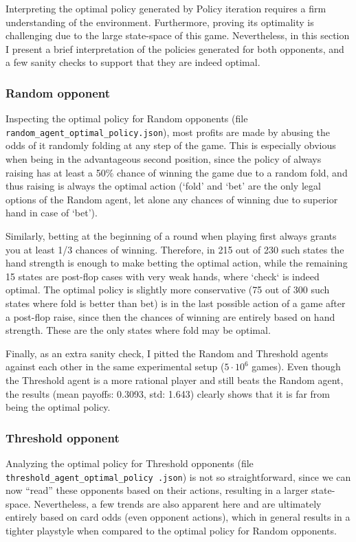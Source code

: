 Interpreting the optimal policy generated by Policy iteration requires a firm understanding of the environment. Furthermore, proving its optimality is challenging due to the large state-space of this game. Nevertheless, in this section I present a brief interpretation of the policies generated for both opponents, and a few sanity checks to support that they are indeed optimal.

\subsubsection{Random opponent}

Inspecting the optimal policy for Random opponents (file \Verb|random_agent_optimal_policy.json|), most profits are made by abusing the odds of it randomly folding at any step of the game. This is especially obvious when being in the advantageous second position, since the policy of always raising has at least a 50\% chance of winning the game due to a random fold, and thus raising is always the optimal action (`fold' and `bet' are the only legal options of the Random agent, let alone any chances of winning due to superior hand in case of `bet').

Similarly, betting at the beginning of a round when playing first always grants you at least 1/3 chances of winning. Therefore, in 215 out of 230 such states the hand strength is enough to make betting the optimal action, while the remaining 15 states are post-flop cases with very weak hands, where `check` is indeed optimal. The optimal policy is slightly more conservative (75 out of 300 such states where fold is better than bet) is in the last possible action of a game after a post-flop raise, since then the chances of winning are entirely based on hand strength. These are the only states where fold may be optimal.

Finally, as an extra sanity check, I pitted the Random and Threshold agents against each other in the same experimental setup ($5\cdot10^6$ games). Even though the Threshold agent is a more rational player and still beats the Random agent, the results (mean payoffs: 0.3093, std: 1.643) clearly shows that it is far from being the optimal policy.

\subsubsection{Threshold opponent}

Analyzing the optimal policy for Threshold opponents (file \texttt{threshold\_agent\_optimal\_policy .json}) is not so straightforward, since we can now ``read'' these opponents based on their actions, resulting in a larger state-space. Nevertheless, a few trends are also apparent here and are ultimately entirely based on card odds (even opponent actions), which in general results in a tighter playstyle when compared to the optimal policy for Random opponents. 

